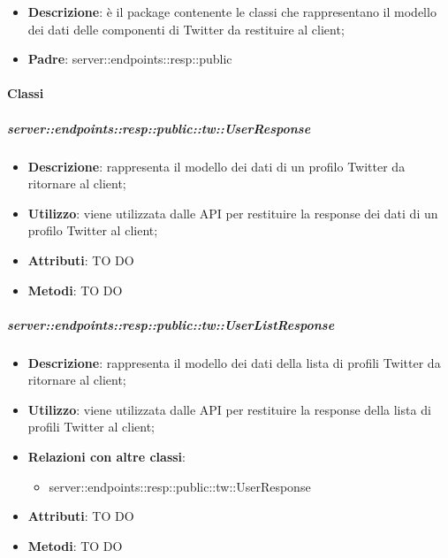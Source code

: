 \begin{itemize}
  \item \textbf{Descrizione}: è il package contenente le classi che rappresentano il modello dei dati delle componenti di Twitter da restituire al client;
  \item \textbf{Padre}: server::endpoints::resp::public
\end{itemize}

	\paragraph{Classi} %

    \subparagraph{server::endpoints::resp::public::tw::UserResponse} %
    \label{subp:bdsm_app_server_endpoints_resp_public_tw_userresponse}
    \begin{itemize}
      \item \textbf{Descrizione}: rappresenta il modello dei dati di un profilo Twitter da ritornare al client;
      \item \textbf{Utilizzo}: viene utilizzata dalle API per restituire la response dei dati di un profilo Twitter al client;
      
	  \item \textbf{Attributi}: TO DO
	  \item \textbf{Metodi}: TO DO
      \end{itemize}

    \subparagraph{server::endpoints::resp::public::tw::UserListResponse} %
    \label{subp:bdsm_app_server_endpoints_resp_public_tw_userlistresponse}
    \begin{itemize}
      \item \textbf{Descrizione}: rappresenta il modello dei dati della lista di profili Twitter da ritornare al client;
      \item \textbf{Utilizzo}: viene utilizzata dalle API per restituire la response della lista di profili Twitter al client;
      \item \textbf{Relazioni con altre classi}:
        \begin{itemize}
          \item server::endpoints::resp::public::tw::UserResponse
        \end{itemize}
	  \item \textbf{Attributi}: TO DO
	  \item \textbf{Metodi}: TO DO
      \end{itemize}

